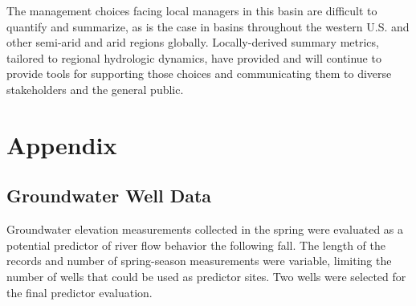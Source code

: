 \documentclass[hess, manuscript]{copernicus}
\begin{document}
The management choices facing local managers in this basin are difficult
to quantify and summarize, as is the case in basins throughout the
western U.S. and other semi-arid and arid regions globally.
Locally-derived summary metrics, tailored to regional hydrologic
dynamics, have provided and will continue to provide tools for
supporting those choices and communicating them to diverse stakeholders
and the general public.

\newpage

\section{Appendix}

\appendixfigures
\appendixtables

\subsection{Groundwater Well Data}

Groundwater elevation measurements collected in the spring were
evaluated as a potential predictor of river flow behavior the following
fall. The length of the records and number of spring-season measurements
were variable, limiting the number of wells that could be used as
predictor sites. Two wells were selected for the final predictor
evaluation.
\end{document}
